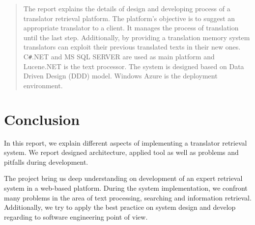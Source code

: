\newcommand{\figurescaling}{0.7}





\maketitle
\begin{abstract}
The report explains the details of design and developing process of a translator retrieval platform. The platform's objective is to suggest an appropriate translator to a client. It manages the process of translation until the last step. Additionally, by providing a translation memory system translators can exploit their previous translated texts in their new ones. C\texttt{\#}.NET and MS SQL SERVER are used as main platform and Lucene.NET is the text processor. The system is designed based on Data Driven Design (DDD) model. Windows Azure is the deployment environment.
\end{abstract}

\vfill
\tableofcontents
\newpage


\newpage

\newpage

\newpage

\newpage

\newpage

\section{Conclusion}
\label{sec:conclusion}
In this report, we explain different aspects of implementing a translator retrieval system. We report designed architecture, applied tool as well as problems and pitfalls during development.

The project bring us deep understanding on development of an expert retrieval system in a web-based platform. During the system implementation, we confront many problems in the area of text processing, searching and information retrieval. Additionally, we try to apply the best practice on system design and develop regarding to software engineering point of view.
\newpage

\listoffigures




